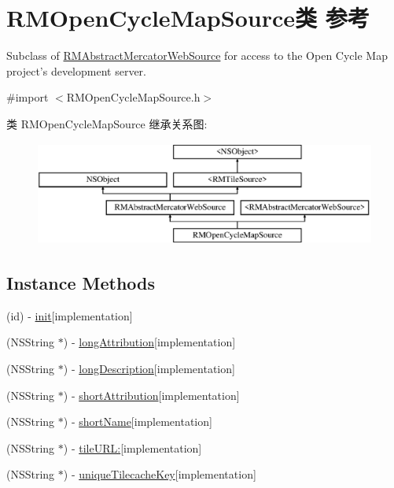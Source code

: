 \hypertarget{interface_r_m_open_cycle_map_source}{\section{R\-M\-Open\-Cycle\-Map\-Source类 参考}
\label{interface_r_m_open_cycle_map_source}
}


Subclass of \hyperlink{interface_r_m_abstract_mercator_web_source}{R\-M\-Abstract\-Mercator\-Web\-Source} for access to the Open Cycle Map project's development server.  




{\ttfamily \#import $<$R\-M\-Open\-Cycle\-Map\-Source.\-h$>$}

类 R\-M\-Open\-Cycle\-Map\-Source 继承关系图\-:\begin{figure}[H]
\begin{center}
\leavevmode
\includegraphics[height=3.425076cm]{interface_r_m_open_cycle_map_source}
\end{center}
\end{figure}
\subsection*{Instance Methods}
\begin{DoxyCompactItemize}
\item 
(id) -\/ \hyperlink{interface_r_m_open_cycle_map_source_a44641fcc78a286cb2deb35124e260165}{init}{\ttfamily  \mbox{[}implementation\mbox{]}}
\item 
(N\-S\-String $\ast$) -\/ \hyperlink{interface_r_m_open_cycle_map_source_af84dc5628aac3458972ab37a9364dd4d}{long\-Attribution}{\ttfamily  \mbox{[}implementation\mbox{]}}
\item 
(N\-S\-String $\ast$) -\/ \hyperlink{interface_r_m_open_cycle_map_source_a3d30e39f50df22cf3ddba68ae4eda864}{long\-Description}{\ttfamily  \mbox{[}implementation\mbox{]}}
\item 
(N\-S\-String $\ast$) -\/ \hyperlink{interface_r_m_open_cycle_map_source_a3c0c39e8ab0896390bd329e75e55860e}{short\-Attribution}{\ttfamily  \mbox{[}implementation\mbox{]}}
\item 
(N\-S\-String $\ast$) -\/ \hyperlink{interface_r_m_open_cycle_map_source_ac9b00e3fbdde801fdda353681d05d838}{short\-Name}{\ttfamily  \mbox{[}implementation\mbox{]}}
\item 
(N\-S\-String $\ast$) -\/ \hyperlink{interface_r_m_open_cycle_map_source_a65f5b088a340d5b0e519a244f4f549fd}{tile\-U\-R\-L\-:}{\ttfamily  \mbox{[}implementation\mbox{]}}
\item 
(N\-S\-String $\ast$) -\/ \hyperlink{interface_r_m_open_cycle_map_source_a8f454702038372b215a4cfabdce76022}{unique\-Tilecache\-Key}{\ttfamily  \mbox{[}implementation\mbox{]}}
\end{DoxyCompactItemize}
